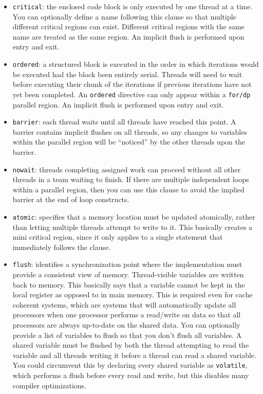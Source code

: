 \documentclass[10pt]{article}
\begin{document}
\begin{flushleft}
\begin{itemize}
\item {\tt critical}: the enclosed code block is only executed by one thread at a time. You can optionally define a name following this clause so that multiple different critical regions can exist. Different critical regions with the same name are treated as the same region. An implicit flush is performed upon entry and exit.
\item {\tt ordered}: a structured block is executed in the order in which iterations would be executed had the block been entirely serial. Threads will need to wait before executing their chunk of the iterations if previous iterations have not yet been completed. An {\tt ordered} directive can only appear within a {\tt for/dp} parallel region. An implicit flush is performed upon entry and exit.
\item {\tt barrier}: each thread waits until all threads have reached this point. A barrier contains implicit flushes on all threads, so any changes to variables within the parallel region will be ``noticed'' by the other threads upon the barrier.
\item {\tt nowait}: threads completing assigned work can proceed without all other threads in a team waiting to finish. If there are multiple independent loops within a parallel region, then you can use this clause to avoid the implied barrier at the end of loop constructs.
\item {\tt atomic}: specifies that a memory location must be updated atomically, rather than letting multiple threads attempt to write to it. This basically creates a mini critical region, since it only applies to a single statement that immediately follows the clause.
\item {\tt flush}: identifies a synchronization point where the implementation must provide a consistent view of memory. Thread-visible variables are written back to memory. This basically says that a variable cannot be kept in the local register as opposed to in main memory. This is required even for cache coherent systems, which are systems that will automatically update all processors when one processor performs a read/write on data so that all processors are always up-to-date on the shared data. You can optionally provide a list of variables to flush so that you don't flush all variables. A shared variable must be flushed by both the thread attempting to read the variable and all threads writing it before a thread can read a shared variable. You could circumvent this by declaring every shared variable as {\tt volatile}, which performs a flush before every read and write, but this disables many compiler optimizations.
\end{itemize}


\end{flushleft}
\end{document}
